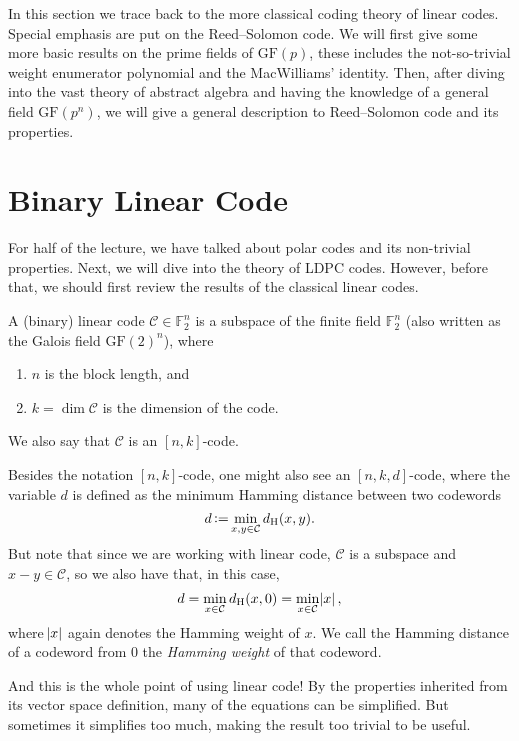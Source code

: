 In this section we trace back to the more classical coding theory of linear codes. Special emphasis are put on the Reed--Solomon code. We will first give some more basic results on the prime fields of $\mathrm{GF}(p)$, these includes the not-so-trivial weight enumerator polynomial and the MacWilliams' identity. Then, after diving into the vast theory of abstract algebra and having the knowledge of a general field $\mathrm{GF}(p^n)$, we will give a general description to Reed--Solomon code and its properties.

\section{Binary Linear Code} \label{sec:w6_algebra}
For half of the lecture, we have talked about polar codes and its non-trivial properties. Next, we will dive into the theory of LDPC codes. However, before that, we should first review the results of the classical linear codes.

\begin{definition}
    A (binary) linear code $\mathcal{C}\in\mathbb{F}^n_2$ is a subspace of the finite field $\mathbb{F}^n_2$ (also written as the Galois field $\mathrm{GF}(2)^n$), where
    \begin{enumerate}
        \item $n$ is the block length, and
        \item $k = \dim\mathcal{C}$ is the dimension of the code.
    \end{enumerate}
    We also say that $\mathcal{C}$ is an $[n,k]$-code.
\end{definition}
Besides the notation $[n,k]$-code, one might also see an $[n,k,d]$-code, where the variable $d$ is defined as the minimum Hamming distance between two codewords
\begin{equation}
    d \operatorname{\vcentcolon=} \min_{x,y\in\mathcal{C}} d_\mathrm{H}(x,y).
\end{equation}
But note that since we are working with linear code, $\mathcal{C}$ is a subspace and $x-y\in\mathcal{C}$, so we also have that, in this case,
\begin{equation}
    d = \min_{x\in\mathcal{C}} d_\mathrm{H}(x,0) = \min_{x\in\mathcal{C}}\abs{x},
\end{equation}
where $\abs{x}$ again denotes the Hamming weight of $x$. We call the Hamming distance of a codeword from 0 the \textit{Hamming weight} of that codeword.

And this is the whole point of using linear code! By the properties inherited from its vector space definition, many of the equations can be simplified. But sometimes it simplifies too much, making the result too trivial to be useful.

